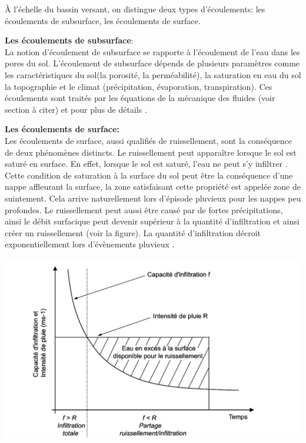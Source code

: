 \documentclass[a4paper,10pt]{article}
\begin{document}
À l’échelle du bassin versant, on distingue deux types d’écoulements: les écoulements de subsurface, les écoulements de surface. 

\textbf{Les écoulements de subsurface}:\\

La notion d'écoulement de subsurface se rapporte à l'écoulement de l'eau dans les pores du sol. L'écoulement de subsurface dépends de plusieurs paramètres comme les caractéristiques du sol(la porosité, la perméabilité), la saturation en eau du sol la topographie et le climat (précipitation, évaporation, transpiration). Ces écoulements sont traités par les équations de la mécanique des fluides (voir section  à citer) et pour plus de détails \cite{de1986quantitative}. 

\textbf{Les écoulements de surface:}\\

Les écoulements de surface, aussi qualifiés de ruissellement, sont la conséquence de deux phénomènes distincts. Le ruissellement peut apparaître lorsque le sol est saturé en surface. En effet, lorsque le sol est saturé, l’eau ne peut s’y infiltrer \cite{cappus1960etude}. Cette condition de saturation à la surface du sol peut être la conséquence d'une nappe affleurant la surface, la zone satisfaisant cette propriété est appelée zone de suintement. Cela arrive naturellement lors d'épisode pluvieux pour les nappes peu profondes. Le ruissellement peut aussi être causé par de fortes précipitations, ainsi le débit surfacique peut devenir supérieur à la quantité d'infiltration et ainsi créer un ruissellement (voir la figure). La quantité d'infiltration décroit exponentiellement lors d'évènements pluvieux \cite{horton1933role}.  

\begin{center}
	\includegraphics[scale=0.2]{ruissellement.png}
\end{center} 
\end{document}
